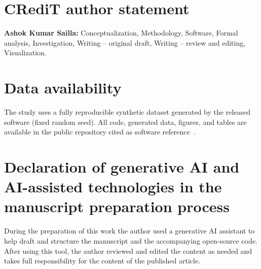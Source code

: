 \documentclass[preprint,12pt]{elsarticle}
\begin{document}
\section*{CRediT author statement}
\textbf{Ashok Kumar Sailla:} Conceptualization, Methodology, Software, Formal analysis,
Investigation, Writing -- original draft, Writing -- review and editing, Visualization.

\section*{Data availability}
The study uses a fully reproducible synthetic dataset generated by the released software
(fixed random seed). All code, generated data, figures, and tables are available in the
public repository cited as software reference~\cite{qaip2026}.

\section*{Declaration of generative AI and AI-assisted technologies in the manuscript preparation process}
During the preparation of this work the author used a generative AI assistant to help
draft and structure the manuscript and the accompanying open-source code. After using
this tool, the author reviewed and edited the content as needed and takes full
responsibility for the content of the published article.
\end{document}
